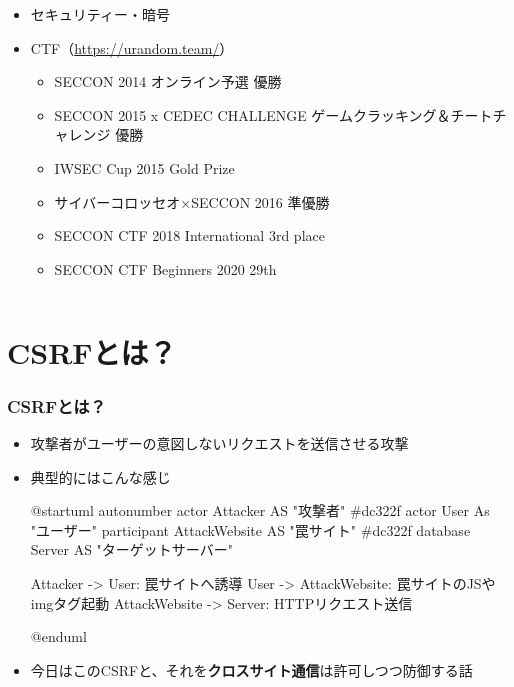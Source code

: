 \begin{frame}
\begin{columns}
\begin{column}{0.7\textwidth}
\begin{itemize}
        \item セキュリティー・暗号
        \item CTF（\url{https://urandom.team/}）
        \begin{itemize}
          \item SECCON 2014 オンライン予選 優勝
          \item SECCON 2015 x CEDEC CHALLENGE ゲームクラッキング＆チートチャレンジ 優勝
          \item IWSEC Cup 2015 Gold Prize
          \item サイバーコロッセオ×SECCON 2016 準優勝
          \item SECCON CTF 2018 International 3rd place
          \item SECCON CTF Beginners 2020 29th
        \end{itemize}
      \end{itemize}
    \end{column}
  \end{columns}
\end{frame}

\section{CSRFとは？}

\begin{frame}[fragile]
  \frametitle{CSRFとは？}

  \begin{itemize}
    \item 攻撃者がユーザーの意図しないリクエストを送信させる攻撃

    \pause
    \item 典型的にはこんな感じ
    \begin{minipage}{.8\textwidth}
      \begin{plantuml}
        @startuml
        autonumber
        actor Attacker AS "攻撃者" #dc322f
        actor User As "ユーザー"
        participant AttackWebsite AS "罠サイト" #dc322f
        database Server AS "ターゲットサーバー"
       
        Attacker -> User: 罠サイトへ誘導
        User -> AttackWebsite: 罠サイトのJSやimgタグ起動
        AttackWebsite -> Server: HTTPリクエスト送信

        @enduml
      \end{plantuml}
    \end{minipage}

    \item 今日はこのCSRFと、それを\textbf{クロスサイト通信}は許可しつつ防御する話
  \end{itemize}
\end{frame}

